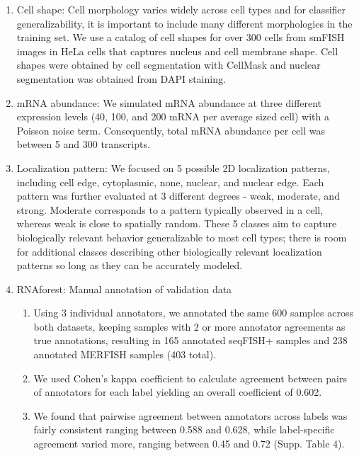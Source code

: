 \begin{enumerate}
    \item Cell shape: Cell morphology varies widely across cell types and for classifier generalizability, it is important to include many different morphologies in the training set. We use a catalog of cell shapes for over 300 cells from smFISH images in HeLa cells that captures nucleus and cell membrane shape\cite{samacoitsComputationalFrameworkStudy2018}. Cell shapes were obtained by cell segmentation with CellMask and nuclear segmentation was obtained from DAPI staining.
    \item mRNA abundance: We simulated mRNA abundance at three different expression levels (40, 100, and 200 mRNA per average sized cell) with a Poisson noise term. Consequently, total mRNA abundance per cell was between 5 and 300 transcripts.
    \item Localization pattern: We focused on 5 possible 2D localization patterns, including cell edge, cytoplasmic, none, nuclear, and nuclear edge. Each pattern was further evaluated at 3 different degrees - weak, moderate, and strong. Moderate corresponds to a pattern typically observed in a cell, whereas weak is close to spatially random. These 5 classes aim to capture biologically relevant behavior generalizable to most cell types; there is room for additional classes describing other biologically relevant localization patterns so long as they can be accurately modeled.
    \item RNAforest: Manual annotation of validation data
    \begin{enumerate}
        \item Using 3 individual annotators, we annotated the same 600 samples across both datasets, keeping samples with 2 or more annotator agreements as true annotations, resulting in 165 annotated seqFISH+ samples and 238 annotated MERFISH samples (403 total).
        \item We used Cohen's kappa coefficient\cite{cohenCoefficientAgreementNominal1960} to calculate agreement between pairs of annotators for each label yielding an overall coefficient of 0.602.
        \item We found that pairwise agreement between annotators across labels was fairly consistent ranging between 0.588 and 0.628, while label-specific agreement varied more, ranging between 0.45 and 0.72 (Supp. Table 4).
    \end{enumerate}
\end{enumerate}

